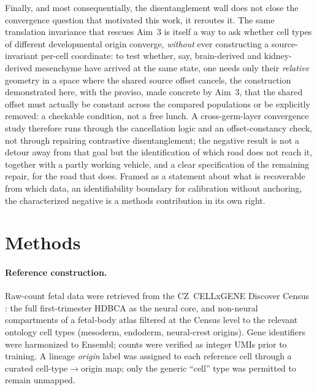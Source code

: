 \documentclass[11pt]{article}
\begin{document}
Finally, and most consequentially, the disentanglement wall does not close the convergence question that
motivated this work, it reroutes it. The same translation invariance that rescues Aim~3 is itself a way
to ask whether cell types of different developmental origin converge, \emph{without} ever constructing a
source-invariant per-cell coordinate: to test whether, say, brain-derived and kidney-derived mesenchyme
have arrived at the same state, one needs only their \emph{relative} geometry in a space where the shared
source offset cancels, the construction demonstrated here, with the proviso, made concrete by Aim~3,
that the shared offset must actually be constant across the compared populations or be explicitly
removed: a checkable condition, not a free lunch. A cross-germ-layer convergence study therefore runs
through the cancellation logic and an offset-constancy check, not through repairing contrastive
disentanglement; the negative result is not a detour away from that goal but the identification of which
road does not reach it, together with a partly working vehicle, and a clear specification of the
remaining repair, for the road that does. Framed as a statement about what is
recoverable from which data, an identifiability boundary for calibration without anchoring, the
characterized negative is a methods contribution in its own right.

\section{Methods}
\paragraph{Reference construction.} Raw-count fetal data were retrieved from the CZ~CELLxGENE Discover
Census \citep{czi2025cellxgene}: the full first-trimester HDBCA \citep{braun2023hdbca} as the neural
core, and non-neural compartments of a fetal-body atlas \citep{cao2020fetal} filtered at the
Census level to the relevant ontology cell types (mesoderm, endoderm, neural-crest origins). Gene
identifiers were harmonized to Ensembl; counts were verified as integer UMIs prior to training. A
lineage \emph{origin} label was assigned to each reference cell through a curated cell-type$\rightarrow$origin
map; only the generic ``cell'' type was permitted to remain unmapped.
\end{document}
